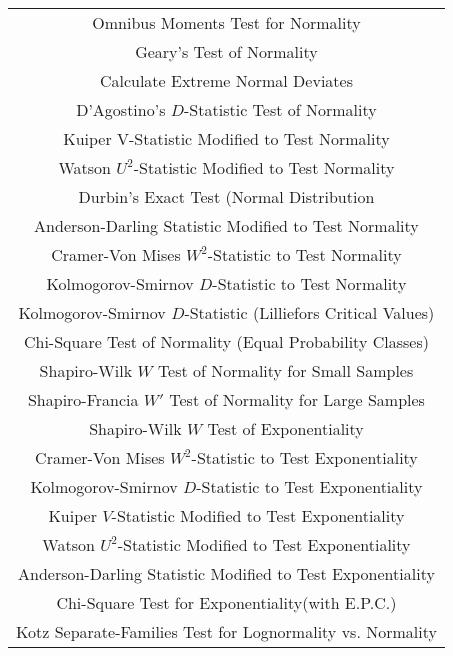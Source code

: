 \begin{tabular}{|c|}
  \hline
Omnibus Moments Test for Normality    \\

Geary's Test of Normality     \\

Calculate Extreme Normal Deviates    \\

D'Agostino's $D$-Statistic Test of Normality    \\

Kuiper V-Statistic Modified to Test Normality    \\

Watson $U^2$-Statistic Modified to Test Normality    \\

Durbin's Exact Test (Normal Distribution    \\

Anderson-Darling Statistic Modified to Test Normality    \\

Cramer-Von Mises $W^2$-Statistic to Test Normality    \\

Kolmogorov-Smirnov $D$-Statistic to Test Normality    \\

Kolmogorov-Smirnov $D$-Statistic (Lilliefors Critical Values)    \\

Chi-Square Test of Normality (Equal Probability Classes)    \\

Shapiro-Wilk $W$ Test of Normality for Small Samples    \\

Shapiro-Francia $W'$ Test of Normality for Large Samples    \\

Shapiro-Wilk $W$ Test of Exponentiality    \\

Cramer-Von Mises $W^2$-Statistic to Test Exponentiality    \\

Kolmogorov-Smirnov $D$-Statistic to Test Exponentiality    \\

Kuiper $V$-Statistic Modified to Test Exponentiality    \\

Watson $U^2$-Statistic Modified to Test Exponentiality    \\

Anderson-Darling Statistic Modified to Test Exponentiality    \\

Chi-Square Test for Exponentiality(with E.P.C.)    \\

Kotz Separate-Families Test for Lognormality vs. Normality    \\
  \hline
\end{tabular}

